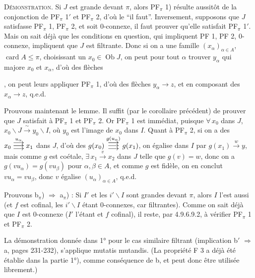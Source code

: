 \documentclass[11pt]{article}
\newcommand{\msp}[1]{\marginpar{\footnotesize [#1]}}
\newcommand{\Ob}{\operatorname{Ob}}
\newcommand{\card}{\operatorname{card}}
\newcommand{\trois}[1]{\mathrel{\overset{#1}{\vcenter{\offinterlineskip\hbox{$\longrightarrow$}\vskip0.5pt\hbox{$\longrightarrow$}\vskip0.5pt\hbox{$\longrightarrow$}}}}}
\begin{document}
\textsc{Démonstration}. Si $J$ est grande devant $\pi$, alors PF$_\pi$ 1) résulte aussitôt de la conjonction de PF$_\pi$ 1$'$ et PF$_\pi$ 2, d'où le “il faut”. Inversement, supposons que $J$ satisfasse PF$_\pi$ 1, PF$_\pi$ 2, et soit 0-connexe, il faut prouver qu'elle satisfait PF$_\pi$ 1$'$. Mais on sait déjà que les conditions en question, qui impliquent PF 1, PF 2, 0-connexe, impliquent que $J$ est filtrante. Donc si on a une famille $(x_\alpha)_{\alpha\in A}$, $\card A \leqslant \pi$, choisissant un $x_0 \in \Ob J$, on peut pour tout $\alpha$ trouver $y_\alpha$ qui majore $x_0$ et $x_\alpha$, d'où des flèches
, on peut leurs appliquer PF$_\pi$ 1, d'où des flèches $y_\alpha \longrightarrow z$, et en composant des $x_\alpha \longrightarrow z$, q.e.d. %

Prouvons maintenant le lemme. Il suffit (par le corollaire précédent) de prouver que $J$ satisfait à PF$_\pi$ 1 et PF$_\pi$ 2. Or PF$_\pi$ 1 est immédiat, puisque $\forall\, x_0$ dans $J$, $x_0\backslash J \xrightarrow{\ \sim\ } y_0\backslash I$, où $y_0$ est
\msp{page 239}
l'image de $x_0$ dans $I$. Quant à PF$_\pi$ 2, si on a des $x_0 \trois{u_\alpha} x_1$ dans $J$, d'où des $g(x_0) \trois{g(u_\alpha)} g(x_1)$, on égalise dans $I$ par $g(x_1) \xrightarrow{w} y$, mais comme $g$ est coétale, $\exists\, x_1 \xrightarrow{v} x_2$ dans $J$ telle que $g(v) = w$, donc on a $g(vu_\alpha) = g(vu_\beta)$ pour $\alpha, \beta \in A$, et comme $g$ est fidèle, on en conclut $vu_\alpha = vu_\beta$, donc $v$ égalise $(u_\alpha)_{\alpha\in A}$, q.e.d.

Prouvons b$_\pi$) $\Longrightarrow$ a$_\pi$) : Si $I'$ et les $i'\backslash I$ sont grandes devant $\pi$, alors $I$ l'est aussi (et $f$ est cofinal, les $i'\backslash I$ étant 0-connexes, car filtrantes). Comme on sait déjà que $I$ est 0-connexe ($I'$ l'étant et $f$ cofinal), il reste, par 4.9.6.9.2, à vérifier PF$_\pi$ 1 et PF$_\pi$ 2.

\msp{page 240}
La démonstration donnée dans 1° pour le cas similaire filtrant (implication b$'$ $\Longrightarrow$ a, pages 231-232), s'applique mutatis mutandis. (La propriété F 3 a déjà été établie dans la partie 1°), comme conséquence de b, et peut donc être utilisée librement.)
\end{document}
